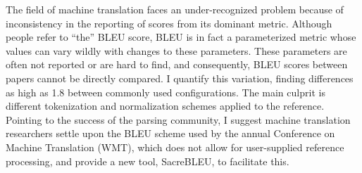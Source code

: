 The field of machine translation faces an under-recognized problem because of inconsistency in the reporting of scores from its dominant metric. Although people refer to ``the'' BLEU score, BLEU is in fact a parameterized metric whose values can vary wildly with changes to these parameters. These parameters are often not reported or are hard to find, and consequently, BLEU scores between papers cannot be directly compared. I quantify this variation, finding differences as high as 1.8 between commonly used configurations. The main culprit is different tokenization and normalization schemes applied to the reference. Pointing to the success of the parsing community, I suggest machine translation researchers settle upon the BLEU scheme used by the annual Conference on Machine Translation (WMT), which does not allow for user-supplied reference processing, and provide a new tool, SacreBLEU, to facilitate this.
